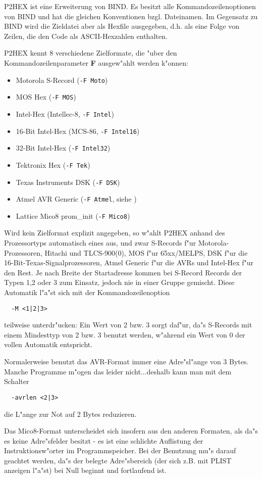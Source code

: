 \documentclass[12pt,a4paper,twoside]{report}
\newcommand{\bb}[1]{{\bf #1}}
\newcommand{\tty}[1]{{\tt #1}}
\begin{document}
{P2HEX ist eine Erweiterung von BIND.  Es besitzt alle
Kommandozeilenoptionen von BIND und hat die gleichen Konventionen
bzgl. Dateinamen.  Im Gegensatz zu BIND wird die Zieldatei aber als
Hexfile ausgegeben, d.h. als eine Folge von Zeilen, die den Code als
ASCII-Hexzahlen enthalten.
\par
P2HEX kennt 8 verschiedene Zielformate, die "uber den
Kommandozeilenparameter \bb{F} ausgew"ahlt werden k"onnen:
\begin{itemize}
\item{Motorola S-Record (\tty{-F Moto})}
\item{MOS Hex (\tty{-F MOS})}
\item{Intel-Hex (Intellec-8, \tty{-F Intel})}
\item{16-Bit Intel-Hex (MCS-86, \tty{-F Intel16})}
\item{32-Bit Intel-Hex (\tty{-F Intel32})}
\item{Tektronix Hex (\tty{-F Tek})}
\item{Texas Instruments DSK (\tty{-F DSK})}
\item{Atmel AVR Generic (\tty{-F Atmel}, siehe \cite{AVRObj})}
\item{Lattice Mico8 prom\_init (\tty{-F Mico8})}
\end{itemize}
Wird kein Zielformat explizit angegeben, so w"ahlt P2HEX anhand des
Prozessortyps automatisch eines aus, und zwar S-Records f"ur Motorola-
Prozessoren, Hitachi und TLCS-900(0), MOS f"ur 65xx/MELPS, DSK f"ur die
16-Bit-Texas-Signalprozessoren, Atmel Generic f"ur die AVRs und Intel-Hex
f"ur den Rest. Je nach Breite der Startadresse kommen bei S-Record Records
der Typen 1,2 oder 3 zum Einsatz, jedoch nie in einer Gruppe gemischt. 
Diese Automatik l"a"st sich mit der Kommandozeilenoption 
\begin{verbatim}
  -M <1|2|3>
\end{verbatim}
teilweise unterdr"ucken: Ein Wert von 2 bzw. 3 sorgt daf"ur, da"s
S-Records mit einem Mindesttyp von 2 bzw. 3 benutzt werden, w"ahrend ein
Wert von 0 der vollen Automatik entspricht.

Normalerweise benutzt das AVR-Format immer eine Adre"sl"ange von 3 Bytes. 
Manche Programme m"ogen das leider nicht...deshalb kann man mit dem
Schalter
\begin{verbatim}
  -avrlen <2|3>
\end{verbatim}
die L"ange zur Not auf 2 Bytes reduzieren.

Das Mico8-Format unterscheidet sich insofern aus den anderen
Formaten, als da"s es keine Adre"sfelder besitzt - es ist eine
schlichte Auflistung der Instruktionsw"orter im Programmspeicher. 
Bei der Benutzung mu"s darauf geachtet werden, da"s der
belegte Adre"sbereich (der sich z.B. mit PLIST anzeigen l"a"st)
bei Null beginnt und fortlaufend ist.

}
\end{document}
